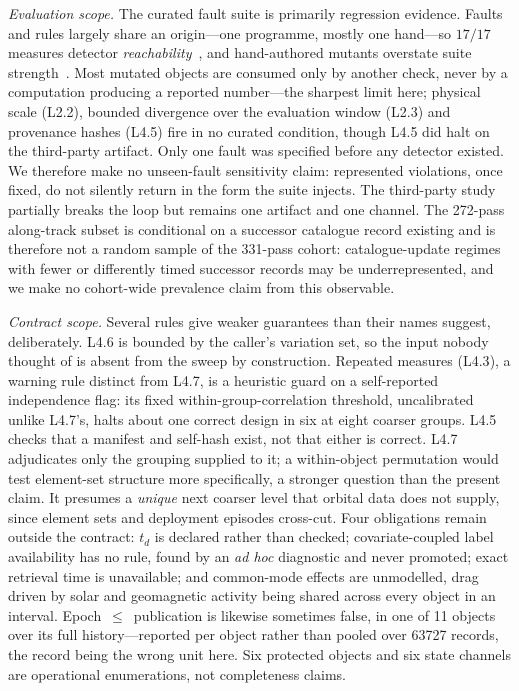 \documentclass[conference]{IEEEtran}
\newcommand{\rulename}[1]{\textsf{#1}}
\newcommand{\artv}[2]{#2}
\begin{document}
\emph{Evaluation scope.} The curated fault suite is primarily regression evidence. Faults and rules largely share an
origin---one programme, mostly one hand---so $17/17$ measures detector
\emph{reachability}~\cite{jia2011mutation}, and hand-authored mutants overstate suite
strength~\cite{just2014mutants}. Most mutated objects are consumed only by another check, never
by a computation producing a reported number---the sharpest limit here; physical scale (\rulename{L2.2}), bounded divergence over the
evaluation window (\rulename{L2.3}) and provenance hashes (\rulename{L4.5}) fire in no curated
condition, though \rulename{L4.5} did halt on the third-party artifact. Only one fault was specified
before any detector existed. We therefore make no unseen-fault sensitivity claim: represented
violations, once fixed, do not silently return in the form the suite injects. The third-party study partially breaks the loop but remains one artifact and one channel. The
\artv{at_passes}{\num{272}}-pass along-track subset is conditional on a successor catalogue record
existing and is therefore not a random sample of the \artv{real_passes}{\num{331}}-pass cohort:
catalogue-update regimes with fewer or differently timed successor records may be
underrepresented, and we make no cohort-wide prevalence claim from this observable.

\emph{Contract scope.} Several rules give weaker guarantees than their names suggest, deliberately.
\rulename{L4.6} is bounded by the caller's variation set, so the input nobody thought of is absent
from the sweep by construction. Repeated measures (\rulename{L4.3}), a warning rule distinct from
\rulename{L4.7}, is a heuristic guard on a self-reported independence flag: its fixed
within-group-correlation threshold, uncalibrated unlike \rulename{L4.7}'s, halts about one correct
design in six at eight coarser groups. \rulename{L4.5} checks
that a manifest and self-hash exist, not that either is correct. \rulename{L4.7} adjudicates only
the grouping supplied to it; a within-object permutation would test element-set structure more
specifically, a stronger question than the present claim. It presumes a \emph{unique} next coarser
level that orbital data does not supply, since element sets and deployment episodes cross-cut. Four obligations remain outside the contract: $t_d$ is declared rather than
checked; covariate-coupled label availability has no rule, found by an \emph{ad hoc} diagnostic and
never promoted; exact retrieval time is unavailable; and common-mode effects are unmodelled, drag
driven by solar and geomagnetic activity being shared across every object in an interval. Epoch~$\le$~publication is likewise
sometimes false, in \artv{timing_outlier_objects}{one} of \artv{lag_objects}{\num{11}} objects over
its full history---reported per object rather than pooled over
\artv{lag_records}{\num{63727}} records, the record being the wrong unit here. \artv{protected_objects}{Six} protected objects and \artv{state_channels}{six} state channels are
operational enumerations, not completeness claims.
\end{document}
